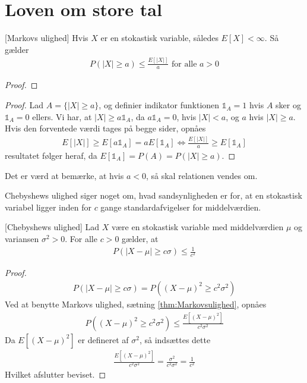 \section{Loven om store tal}
\begin{theorem} \label{thm:Markovsulighed}[Markovs ulighed]
Hvis $X$ er en stokastisk variable, således
$E[X] < \infty$. Så gælder
\begin{align*}
    P(|X|\geq a) \leq \frac{E[|X|]}{a} \text{ for alle } a > 0
\end{align*}
\end{theorem}
\begin{proof}
\end{proof}
\begin{proof}
  Lad $A=\{|X|\geq a\}$, og definier indikator funktionen $\mathbb{1}_A = 1$ hvis $A$ sker og $\mathbb{1}_{A} = 0$ ellers. Vi har, at $|X| \geq a\mathbb{1}_{A}$, da $a\mathbb{1}_{A} = 0$, hvis $|X| < a$, og $a$ hvis $|X| \geq a$. Hvis den forventede værdi tages på begge sider, opnåes
  \begin{align*}
    E[|X|]\geq E[a\mathbb{1}_{A}] = a E[\mathbb{1}_A] \iff \frac{E[|X|]}{a}\geq E[\mathbb{1}_A]
  \end{align*}
  resultatet følger heraf, da $E[\mathbb{1}_{A}] = P(A) = P(|X| \geq a)$.
\end{proof}
Det er værd at bemærke, at hvis $a<0$, så skal relationen vendes om.

Chebyshews ulighed siger noget om, hvad sandsynligheden er for, at en stokastisk variabel ligger inden for $c$ gange standardafvigelser for middelværdien.
\begin{theorem} \label{Thm:Chebyshewsulighed}[Chebyshews ulighed]
    Lad $X$ være en stokastisk variable med middelværdien $\mu$ og variansen $\sigma^2>0$. For alle $c>0$ gælder, at
    \begin{align*}
        P(|X-\mu|\geq c \sigma)\leq \frac{1}{c^2}
    \end{align*}
\end{theorem}
\begin{proof}%
    \begin{align*}
        P(|X-\mu|\geq c \sigma)=P((X-\mu)^2\geq c^2\sigma^2)
    \end{align*}
Ved at benytte Markovs ulighed, sætning \ref{thm:Markovsulighed}, opnåes
\begin{align*}
    P((X-\mu)^2\geq c^2\sigma^2) \leq \frac{E[(X-\mu)^2]}{c^2\sigma^2}
\end{align*}
Da $E[(X-\mu)^2]$ er defineret af $\sigma^2$, så indsættes dette
\begin{align*}
    \frac{E[(X-\mu)^2]}{c^2\sigma^2} = \frac{\sigma^2}{c^2\sigma^2} = \frac{1}{c^2}
\end{align*}
Hvilket afslutter beviset.
\end{proof}

